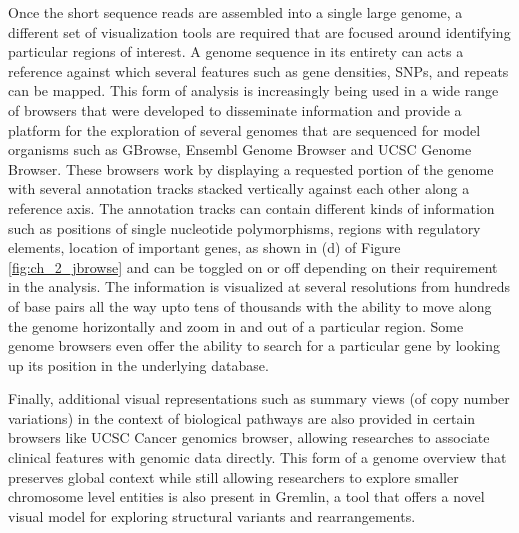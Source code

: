 Once the short sequence reads are assembled into a single large genome, a different set of visualization tools are required that are focused around identifying particular regions of interest. A genome sequence in its entirety can acts a reference against which several features such as gene densities, SNPs, and repeats can be mapped. This form of analysis is increasingly being used in a wide range of browsers that were developed to disseminate information and provide a platform for the exploration of several genomes that are sequenced for model organisms such as GBrowse\cite{stein2002generic}, Ensembl Genome Browser\cite{stalker2004ensembl} and UCSC Genome Browser\cite{ucscgenome}. These browsers work by displaying a requested portion of the genome with several annotation tracks stacked vertically against each other along a reference axis. The annotation tracks can contain different kinds of information such as positions of single nucleotide polymorphisms, regions with regulatory elements, location of important genes, as shown in (d) of Figure \ref{fig:ch_2_jbrowse} and can be toggled on or off depending on their requirement in the analysis. The information is visualized at several resolutions from hundreds of base pairs all the way upto tens of thousands with the ability to move along the genome horizontally and zoom in and out of a particular region. Some genome browsers even offer the ability to search for a particular gene by looking up its position in the underlying database\cite{nielsen2010visualizing}. 

Finally, additional visual representations such as summary views (of copy number variations) in the context of biological pathways are also provided in certain browsers like UCSC Cancer genomics browser\cite{ucscgenome}, allowing researches to associate clinical features with genomic data directly. This form of a genome overview that preserves global context while still allowing researchers to explore smaller chromosome level entities is also present in Gremlin, a tool that offers a novel visual model for exploring structural variants and rearrangements\cite{o2010gremlin}.  

